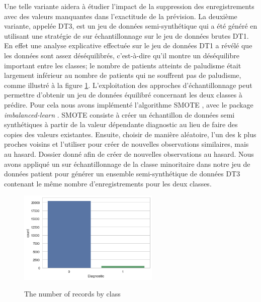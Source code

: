 Une telle variante aidera à étudier l’impact de la suppression des enregistrements avec des valeurs manquantes dans l'exactitude de la prévision.
La deuxième variante, appelée \textsc{DT3}, est un jeu de données semi-synthétique qui a été généré en utilisant une stratégie de sur échantillonnage sur le jeu  de données brutes \textsc{DT1}. En effet une analyse explicative effectuée sur le jeu de données \textsc{DT1} a révélé que les données sont assez déséquilibrés, c'est-à-dire qu'il montre un déséquilibre important entre les classes; le nombre de  patients atteints de paludisme était largement inférieur au nombre de patients qui ne souffrent pas de paludisme, comme illustré à la figure \ref{records_class}. L’exploitation des approches d'échantillonnage peut permettre d’obtenir un jeu de données équilibré concernant les deux classes à prédire. 
Pour cela nous avons implémenté l’algorithme SMOTE \cite{Wa06},  avec le package \emph{imbalanced-learn} \cite{Gu17}. SMOTE consiste à créer un échantillon de données semi synthétiques à partir de la valeur dépendante  diagnostic au lieu de faire des copies des valeurs existantes. Ensuite, choisir de manière aléatoire, l'un des k plus proches voisins et l'utiliser pour créer de nouvelles observations similaires, mais au hasard.
Dossier donné afin de créer de nouvelles observations au hasard. Nous avons appliqué un sur échantillonnage de la classe minoritaire dans notre jeu de données patient pour générer un ensemble  semi-synthétique de données \textsc{DT3} contenant le même nombre d'enregistrements pour les deux classes.
\begin{figure}[h]
\centering
\includegraphics[width=0.6\textwidth]{images/imbalanced_dataset}
\label{records_class}\caption{The number of records by class}
\end{figure} 
